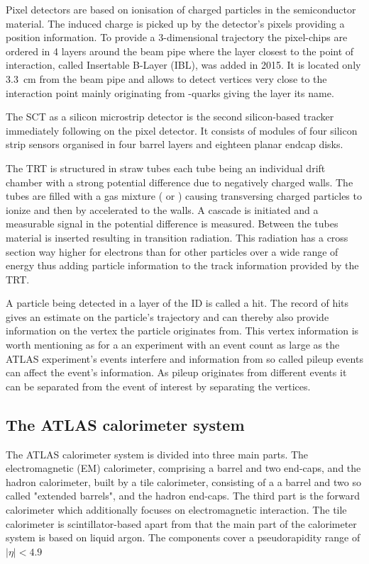 Pixel detectors are based on ionisation of charged particles in the semiconductor material. The induced charge is picked up by the detector's pixels providing a position information. To provide a 3-dimensional trajectory the pixel-chips are ordered in 4 layers around the beam pipe where the layer closest to the point of interaction, called Insertable B-Layer (IBL), was added in 2015. It is located only \SI{3.3}{\centi \metre} from the beam pipe and allows to detect vertices very close to the interaction point mainly originating from \Pbottom-quarks giving the layer its name.~\cite{pixel_run2}

The SCT as a silicon microstrip detector is the second silicon-based tracker immediately following on the pixel detector. It consists of modules of four silicon strip sensors organised in four barrel layers and eighteen planar endcap disks.

The TRT is structured in straw tubes each tube being an individual drift chamber with a strong potential difference due to negatively charged walls. The tubes are filled with a gas mixture ( or ) causing transversing charged particles to ionize and then by accelerated to the walls. A cascade is initiated and a measurable signal in the potential difference is measured. 
Between the tubes material is inserted resulting in transition radiation. This radiation has a cross section way higher for electrons than for other particles over a wide range of energy thus adding particle information to the track information provided by the TRT.

A particle being detected in a layer of the ID is called a hit. The record of hits gives an estimate on the particle's trajectory and can thereby also provide information on the vertex the particle originates from. This vertex information is worth mentioning as for a an experiment with an event count as large as the ATLAS experiment's events interfere and information from so called pileup events can affect the event's information. As pileup originates from different events it can be separated from the event of interest by separating the vertices.

\subsection{The ATLAS calorimeter system}

The ATLAS calorimeter system is divided into three main parts. The electromagnetic (EM) calorimeter, comprising a barrel and two end-caps, and the hadron calorimeter, built by a tile calorimeter, consisting of a a barrel and two so called "extended barrels", and the hadron end-caps. The third part is the forward calorimeter which additionally focuses on electromagnetic interaction. The tile calorimeter is scintillator-based apart from that the main part of the calorimeter system is based on liquid argon. The components cover a pseudorapidity range of $|\eta| < 4.9$

